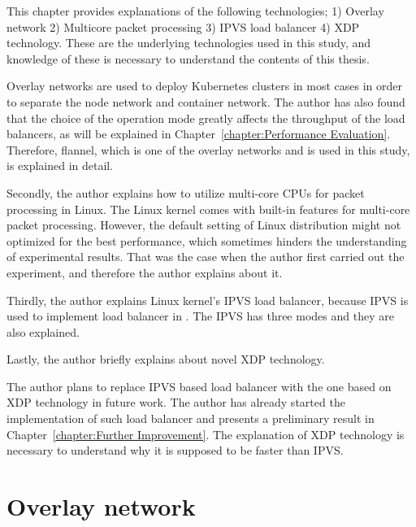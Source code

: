 

  This chapter provides explanations of the following technologies;
  1) Overlay network
  2) Multicore packet processing
  3) IPVS load balancer
  4) XDP technology.
  These are the underlying technologies used in this study, and knowledge of these is necessary to understand the contents of this thesis.





Overlay networks are used to deploy Kubernetes clusters in most cases in order to separate the node network and container network.
The author has also found that the choice of the operation mode  greatly affects the throughput of the load balancers, as will be explained in Chapter~\ref{chapter:Performance Evaluation}.
Therefore, flannel, which is one of the overlay networks and is used in this study, is explained in detail.

Secondly, the author explains how to utilize multi-core CPUs for packet processing in Linux.
The Linux kernel comes with built-in features for multi-core packet processing.
However, the default setting of Linux distribution might not  optimized for the best performance, which sometimes hinders the understanding of experimental results.
That was the case when the author first carried out the experiment, and therefore the author explains about it.

Thirdly, the author explains Linux kernel's IPVS load balancer, because IPVS is used to implement  load balancer in .
The IPVS has three  modes and they are also explained.

Lastly, the author briefly explains about novel XDP technology.
%

The author plans to replace IPVS based load balancer with the one based on XDP technology in future work.
The author has already started the implementation of such load balancer and presents a preliminary result in Chapter~\ref{chapter:Further Improvement}.
The explanation of XDP technology is necessary to understand why it is supposed to be faster than IPVS.


\section{Overlay network}


